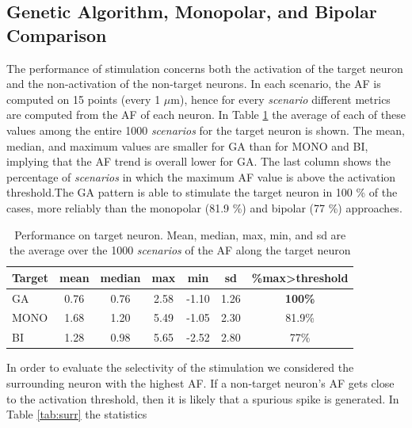 \documentclass[conference]{IEEEtran}
\begin{document}
\subsection{Genetic Algorithm, Monopolar, and Bipolar Comparison}

The performance of stimulation concerns both the activation of the
target neuron and the non-activation of the non-target neurons. In
each scenario, the AF is computed on 15 points (every 1 $\mu$m),
hence for every \emph{scenario }different metrics are computed from
the AF of each neuron. In Table \ref{tab:trg} the average of each
of these values among the entire 1000 \emph{scenarios }for the target
neuron is shown. The mean, median, and maximum values are smaller
for GA than for MONO and BI, implying that the AF trend is overall
lower for GA. The last column shows the percentage of \emph{scenarios}
in which the maximum AF value is above the activation threshold.The
GA pattern is able to stimulate the target neuron in 100 \% of the
cases, more reliably than the monopolar (81.9 \%) and bipolar (77
\%) approaches. \\
\begin{table}[b]
\begin{centering}
\begin{tabular}{lcccccc}
\textbf{Target} & {\scriptsize{}mean} & {\scriptsize{}median} & {\scriptsize{}max} & {\scriptsize{}min} & {\scriptsize{}sd} & {\scriptsize{}\%max>threshold}\tabularnewline
\hline 
\noalign{\vskip\doublerulesep}
{\scriptsize{}GA} & 0.76 & 0.76 & 2.58 & -1.10 & {\footnotesize{}1.26} & \textbf{\footnotesize{}100\%}\tabularnewline
\noalign{\vskip\doublerulesep}
{\scriptsize{}MONO} & 1.68 & {\footnotesize{}1.20} & 5.49 & -1.05 & 2.30 & {\footnotesize{}81.9\%}\tabularnewline
\noalign{\vskip\doublerulesep}
{\scriptsize{}BI} & 1.28 & 0.98 & 5.65 & -2.52 & 2.80 & {\footnotesize{}77\%}\tabularnewline
\end{tabular}\medskip{}

\par\end{centering}

\caption{\label{tab:trg} Performance on target neuron. Mean, median, max,
min, and sd are the average over the 1000 \emph{scenarios }of the
AF along the target neuron }
\end{table}
In order to evaluate the selectivity of the stimulation we considered
the surrounding neuron with the highest AF. If a non-target neuron's
AF gets close to the activation threshold, then it is likely that
a spurious spike is generated. In Table \ref{tab:surr} the statistics
\end{document}

